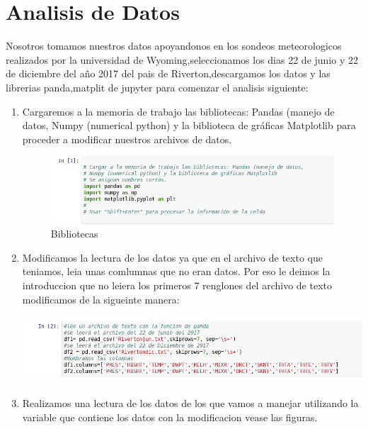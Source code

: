\documentclass{article}
\begin{document}
 \section{Analisis de Datos}
 Nosotros tomamos nuestros datos apoyandonos en los sondeos meteorologicos realizados por la universidad de Wyoming,seleccionamos los dias 22 de junio y 22 de diciembre del año 2017 del pais de Riverton,descargamos los datos y las librerias panda,matplit de jupyter para comenzar el analisis siguiente:
 
 \begin{enumerate}
 \item Cargaremos a la memoria de trabajo las bibliotecas: Pandas (manejo de datos, 
Numpy (numerical python) y la biblioteca de gráficas Matplotlib para proceder a modificar nuestros archivos de datos.

\begin{figure}[ht!]
 \includegraphics[width=1\linewidth]{3_1.png}
 \caption{Bibliotecas }
 \label{fig:1}
 \end{figure}
 
 \item Modificamos la lectura de los datos ya que en el archivo de texto que teniamos, leia unas comlumnas que no eran datos. Por eso le deimos la introduccion que no leiera los primeros 7 renglones del archivo de texto modificamos de la sigueinte manera:
 
 \begin{center}
	
    \includegraphics[height=2.5cm]{3_2.png}
\end{center}
 
 \item Realizamos una lectura de los datos de los que vamos a manejar utilizando la variable que contiene los datos con la modificacion vease las figuras.
 
 \begin{center}
	

\end{center}
\end{enumerate}
\end{document}
